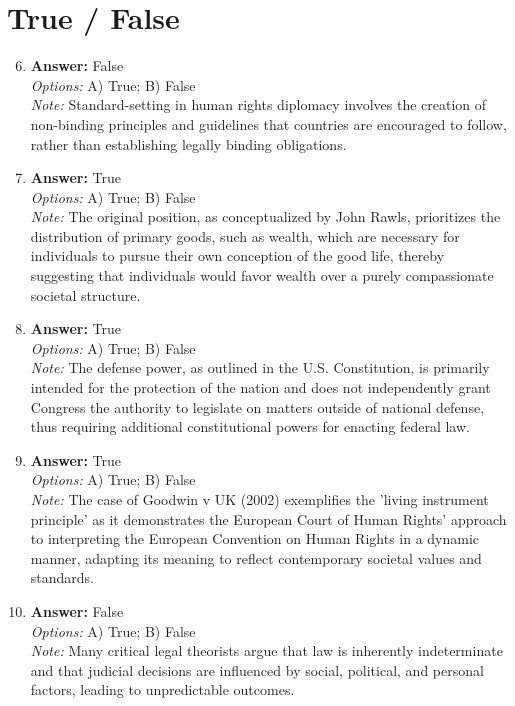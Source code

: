 \documentclass[12pt]{article}
\begin{document}
\section*{True / False}
\begin{enumerate}[label=\arabic*.]
\setcounter{enumi}{5}
\item \textbf{Answer:} False
\\ \textit{Options:} A) True; B) False
\\ \textit{Note:} Standard-setting in human rights diplomacy involves the creation of non-binding principles and guidelines that countries are encouraged to follow, rather than establishing legally binding obligations.
\item \textbf{Answer:} True
\\ \textit{Options:} A) True; B) False
\\ \textit{Note:} The original position, as conceptualized by John Rawls, prioritizes the distribution of primary goods, such as wealth, which are necessary for individuals to pursue their own conception of the good life, thereby suggesting that individuals would favor wealth over a purely compassionate societal structure.
\item \textbf{Answer:} True
\\ \textit{Options:} A) True; B) False
\\ \textit{Note:} The defense power, as outlined in the U.S. Constitution, is primarily intended for the protection of the nation and does not independently grant Congress the authority to legislate on matters outside of national defense, thus requiring additional constitutional powers for enacting federal law.
\item \textbf{Answer:} True
\\ \textit{Options:} A) True; B) False
\\ \textit{Note:} The case of Goodwin v UK (2002) exemplifies the 'living instrument principle' as it demonstrates the European Court of Human Rights' approach to interpreting the European Convention on Human Rights in a dynamic manner, adapting its meaning to reflect contemporary societal values and standards.
\item \textbf{Answer:} False
\\ \textit{Options:} A) True; B) False
\\ \textit{Note:} Many critical legal theorists argue that law is inherently indeterminate and that judicial decisions are influenced by social, political, and personal factors, leading to unpredictable outcomes.
\end{enumerate}
\end{document}
